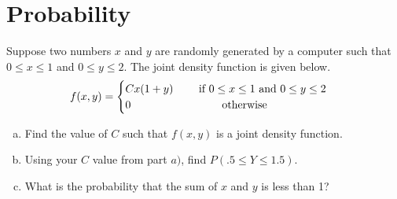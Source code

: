 \documentclass[11pt,letterpaper]{article}
\newif\ifshowsolutions
\newcommand{\sol}[1]{%
\ifshowsolutions
\par\vspace{0.3em}{\color{red}#1}\par
\fi
}
\begin{document}
\vfill 

\pagebreak 


 \section{Probability}
Suppose two numbers $x$ and $y$ are randomly generated by a computer such that ${0\leq x\leq 1}$ and $0\leq y\leq 2$. The joint density function is given below.
$$ f(x,y) = \begin{cases}
Cx(1+y)\qquad \text{ if $ 0\leq x\leq 1$ and $ 0\leq y\leq 2$}\\
0 \qquad\qquad\qquad\qquad \text{ otherwise} \end{cases} $$
 
 
 \begin{enumerate}[a)]
\item Find the value of $C$ such that $f(x,y)$ is a joint density function.
\sol{%
\textbf{Solution.}
A joint density must satisfy $\iint_{\mathbb{R}^2} f(x,y)\,dA=1$:
\begin{align*}
\int_0^1\int_0^2 Cx(1+y)\,dy\,dx
&= C\int_0^1 x\,dx\int_0^2(1+y)\,dy
= C\cdot\frac{1}{2}\cdot\Bigl[y+\frac{y^2}{2}\Bigr]_0^2
= C\cdot\frac{1}{2}\cdot 4
= 2C.
\end{align*}
Set $2C=1$, so $\displaystyle C=\frac{1}{2}$.
}
\vfill
\item Using your $C$ value from part $a)$, find $P( .5 \leq Y\leq 1.5)$.
\sol{%
\textbf{Solution.}
With $C=1/2$,
\begin{align*}
P(0.5\leq Y\leq 1.5)
&= \int_0^1\int_{0.5}^{1.5}\frac{1}{2}x(1+y)\,dy\,dx
= \frac{1}{2}\int_0^1 x\,dx\int_{0.5}^{1.5}(1+y)\,dy.
\end{align*}
\begin{align*}
\int_{0.5}^{1.5}(1+y)\,dy
&= \Bigl[y+\frac{y^2}{2}\Bigr]_{1/2}^{3/2}
= \Bigl(\frac{3}{2}+\frac{9}{8}\Bigr)-\Bigl(\frac{1}{2}+\frac{1}{8}\Bigr)
= \frac{21}{8}-\frac{5}{8}
= 2.
\end{align*}
\begin{align*}
P &= \frac{1}{2}\cdot\frac{1}{2}\cdot 2 = \frac{1}{2}.
\end{align*}
}
\vfill
\item What is the probability that the sum of $x$ and $y$ is less than 1?
\sol{%
\textbf{Solution.}
We want $P(X+Y<1)$ over the rectangle $[0,1]\times[0,2]$. That region is $0\leq x\leq 1$, $0\leq y\leq 1-x$ (since $1-x\leq 1<2$).
\begin{align*}
P(X+Y<1)
&= \int_0^1\int_0^{1-x}\frac{1}{2}x(1+y)\,dy\,dx
= \frac{1}{2}\int_0^1 x\Bigl[y+\frac{y^2}{2}\Bigr]_0^{1-x}\,dx \\
&= \frac{1}{2}\int_0^1 x\Bigl((1-x)+\frac{(1-x)^2}{2}\Bigr)\,dx
= \frac{1}{2}\int_0^1 x\cdot\frac{2(1-x)+(1-x)^2}{2}\,dx \\
&= \frac{1}{4}\int_0^1 x\bigl(2-2x+1-2x+x^2\bigr)\,dx
= \frac{1}{4}\int_0^1\bigl(3x-4x^2+x^3\bigr)\,dx \\
&= \frac{1}{4}\Bigl[\frac{3}{2}x^2-\frac{4}{3}x^3+\frac{1}{4}x^4\Bigr]_0^1
= \frac{1}{4}\Bigl(\frac{3}{2}-\frac{4}{3}+\frac{1}{4}\Bigr)
= \frac{1}{4}\cdot\frac{5}{12}
= \frac{5}{48}.
\end{align*}
}
\end{enumerate}
\end{document}
